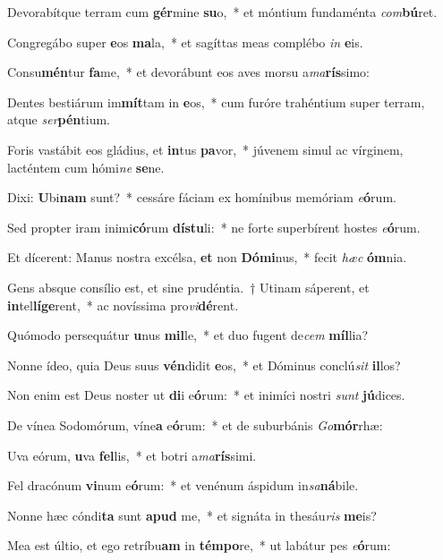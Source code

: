 \item Devorabítque terram cum \textbf{gér}mine \textbf{su}o,~* et móntium fundaménta \textit{com}\textbf{bú}ret.
\item Congregábo super \textbf{e}os \textbf{ma}la,~* et sagíttas meas complébo \textit{in} \textbf{e}is.
\item Consu\textbf{mén}tur \textbf{fa}me,~* et devorábunt eos aves morsu a\textit{ma}\textbf{rís}simo:
\item Dentes bestiárum im\textbf{mít}tam in \textbf{e}os,~* cum furóre trahéntium super terram, atque \textit{ser}\textbf{pén}tium.
\item Foris vastábit eos gládius, et \textbf{in}tus \textbf{pa}vor,~* júvenem simul ac vírginem, lacténtem cum hómi\textit{ne} \textbf{se}ne.
\item Dixi: \textbf{U}bi\textbf{nam} sunt?~* cessáre fáciam ex homínibus memóriam \textit{e}\textbf{ó}rum.
\item Sed propter iram inimi\textbf{có}rum \textbf{dís}\textbf{tu}li:~* ne forte superbírent hostes \textit{e}\textbf{ó}rum.
\item Et dícerent: Manus nostra excélsa, \textbf{et} non \textbf{Dó}\textbf{mi}nus,~* fecit \textit{hæc} \textbf{óm}nia.
\item Gens absque consílio est, et sine prudéntia.~† Utinam sáperent, et \textbf{in}tel\textbf{lí}\textbf{ge}rent,~* ac novíssima pro\textit{vi}\textbf{dé}rent.
\item Quómodo persequátur \textbf{u}nus \textbf{mil}le,~* et duo fugent de\textit{cem} \textbf{míl}lia?
\item Nonne ídeo, quia Deus suus \textbf{vén}didit \textbf{e}os,~* et Dóminus conclú\textit{sit} \textbf{il}los?
\item Non enim est Deus noster ut \textbf{di}i e\textbf{ó}rum:~* et inimíci nostri \textit{sunt} \textbf{jú}dices.
\item De vínea Sodomórum, víne\textbf{a} e\textbf{ó}rum:~* et de suburbánis \textit{Go}\textbf{mór}rhæ:
\item Uva eórum, \textbf{u}va \textbf{fel}lis,~* et botri a\textit{ma}\textbf{rís}simi.
\item Fel dracónum \textbf{vi}num e\textbf{ó}rum:~* et venénum áspidum in\textit{sa}\textbf{ná}bile.
\item Nonne hæc cóndi\textbf{ta} sunt \textbf{a}\textbf{pud} me,~* et signáta in thesáu\textit{ris} \textbf{me}is?
\item Mea est últio, et ego retríbu\textbf{am} in \textbf{tém}\textbf{po}re,~* ut labátur pes \textit{e}\textbf{ó}rum:
